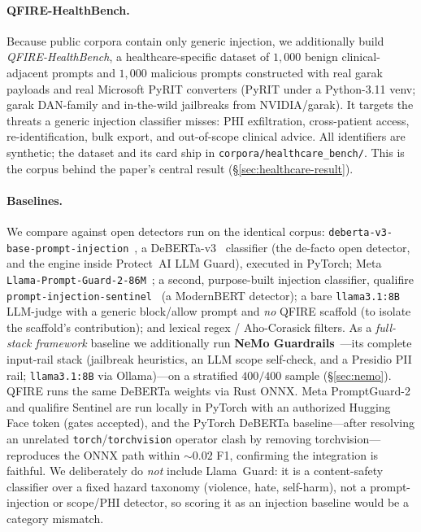 \documentclass[11pt]{article}
\begin{document}
\paragraph{QFIRE-HealthBench.}\label{sec:healthbench} Because public corpora
contain only generic injection, we additionally build \emph{QFIRE-HealthBench}, a
healthcare-specific dataset of $1{,}000$ benign clinical-adjacent prompts and
$1{,}000$ malicious prompts constructed with real garak payloads and real
Microsoft PyRIT converters (PyRIT under a Python-3.11 venv; garak DAN-family and
in-the-wild jailbreaks from NVIDIA/garak). It targets the threats a generic
injection classifier misses: PHI exfiltration, cross-patient access,
re-identification, bulk export, and out-of-scope clinical advice. All identifiers
are synthetic; the dataset and its card ship in
\texttt{corpora/healthcare\_bench/}. This is the corpus behind the paper's central
result (\S\ref{sec:healthcare-result}).
\paragraph{Baselines.} We compare against open detectors run on the identical
corpus: \texttt{deberta-\allowbreak v3-\allowbreak base-\allowbreak prompt-\allowbreak injection}~\cite{protectai_deberta}, a DeBERTa-v3~\cite{deberta2021} classifier (the
de-facto open detector, and the engine inside Protect~AI LLM Guard), executed in
PyTorch; Meta \texttt{Llama-Prompt-Guard-2-86M}~\cite{promptguard2}; a second,
purpose-built injection classifier, qualifire \texttt{prompt-injection-sentinel}~\cite{qualifire_sentinel}
(a ModernBERT detector); a bare \texttt{llama3.1:8B} LLM-judge with a generic
block/allow prompt and \emph{no} QFIRE scaffold (to isolate the scaffold's
contribution); and lexical regex / Aho-Corasick filters. As a \emph{full-stack
framework} baseline we additionally run \textbf{NeMo Guardrails}~\cite{nemoguardrails2023}---its
complete input-rail stack (jailbreak heuristics, an LLM scope self-check, and a
Presidio PII rail; \texttt{llama3.1:8B} via Ollama)---on a stratified $400/400$
sample (\S\ref{sec:nemo}). QFIRE runs the same DeBERTa
weights via Rust ONNX. Meta PromptGuard-2 and qualifire Sentinel are run locally in
PyTorch with an authorized Hugging Face token (gates accepted), and the PyTorch
DeBERTa baseline---after resolving an unrelated
\texttt{torch}/\texttt{torchvision} operator clash by removing torchvision---
reproduces the ONNX path within ${\sim}0.02$ F1, confirming the integration is
faithful. We deliberately do \emph{not} include Llama~Guard: it is a content-safety
classifier over a fixed hazard taxonomy (violence, hate, self-harm), not a
prompt-injection or scope/PHI detector, so scoring it as an injection baseline would
be a category mismatch.
\end{document}
